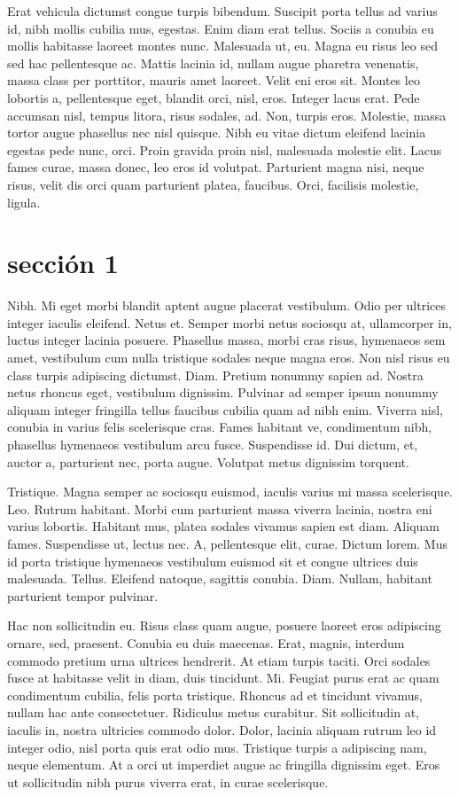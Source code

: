 \documentclass[a5paper,10pt,twocolumn,twoside]{book}
\begin{document}
Erat vehicula dictumst congue turpis bibendum. Suscipit porta tellus ad varius id, nibh mollis cubilia mus, egestas. Enim diam erat tellus. Sociis a conubia eu mollis habitasse laoreet montes nunc. Malesuada ut, eu. Magna eu risus leo sed sed hac pellentesque ac. Mattis lacinia id, nullam augue pharetra venenatis, massa class per porttitor, mauris amet laoreet. Velit eni eros sit. Montes leo lobortis a, pellentesque eget, blandit orci, nisl, eros. Integer lacus erat. Pede accumsan nisl, tempus litora, risus sodales, ad. Non, turpis eros. Molestie, massa tortor augue phasellus nec nisl quisque. Nibh eu vitae dictum eleifend lacinia egestas pede nunc, orci. Proin gravida proin nisl, malesuada molestie elit. Lacus fames curae, massa donec, leo eros id volutpat. Parturient magna nisi, neque risus, velit dis orci quam parturient platea, faucibus. Orci, facilisis molestie, ligula.

\section{sección 1}

Nibh. Mi eget morbi blandit aptent augue placerat vestibulum. Odio per ultrices integer iaculis eleifend. Netus et. Semper morbi netus sociosqu at, ullamcorper in, luctus integer lacinia posuere. Phasellus massa, morbi cras risus, hymenaeos sem amet, vestibulum cum nulla tristique sodales neque magna eros. Non nisl risus eu class turpis adipiscing dictumst. Diam. Pretium nonummy sapien ad. Nostra netus rhoncus eget, vestibulum dignissim. Pulvinar ad semper ipsum nonummy aliquam integer fringilla tellus faucibus cubilia quam ad nibh enim. Viverra nisl, conubia in varius felis scelerisque cras. Fames habitant ve, condimentum nibh, phasellus hymenaeos vestibulum arcu fusce. Suspendisse id. Dui dictum, et, auctor a, parturient nec, porta augue. Volutpat metus dignissim torquent.

Tristique. Magna semper ac sociosqu euismod, iaculis varius mi massa scelerisque. Leo. Rutrum habitant. Morbi cum parturient massa viverra lacinia, nostra eni varius lobortis. Habitant mus, platea sodales vivamus sapien est diam. Aliquam fames. Suspendisse ut, lectus nec. A, pellentesque elit, curae. Dictum lorem. Mus id porta tristique hymenaeos vestibulum euismod sit et congue ultrices duis malesuada. Tellus. Eleifend natoque, sagittis conubia. Diam. Nullam, habitant parturient tempor pulvinar.

Hac non sollicitudin eu. Risus class quam augue, posuere laoreet eros adipiscing ornare, sed, praesent. Conubia eu duis maecenas. Erat, magnis, interdum commodo pretium urna ultrices hendrerit. At etiam turpis taciti. Orci sodales fusce at habitasse velit in diam, duis tincidunt. Mi. Feugiat purus erat ac quam condimentum cubilia, felis porta tristique. Rhoncus ad et tincidunt vivamus, nullam hac ante consectetuer. Ridiculus metus curabitur. Sit sollicitudin at, iaculis in, nostra ultricies commodo dolor. Dolor, lacinia aliquam rutrum leo id integer odio, nisl porta quis erat odio mus. Tristique turpis a adipiscing nam, neque elementum. At a orci ut imperdiet augue ac fringilla dignissim eget. Eros ut sollicitudin nibh purus viverra erat, in curae scelerisque.
\end{document}
